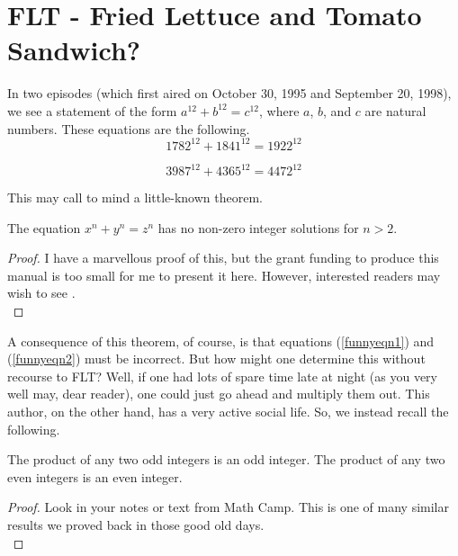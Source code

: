 \chapter{FLT - Fried Lettuce and Tomato Sandwich?}

In two episodes (which first aired on October 30, 1995
and September 20, 1998), we see a statement of the form 
$a^{12}+b^{12}=c^{12}$, where $a$, $b$, and $c$ are natural numbers.
These equations are the following.
\begin{equation}
1782^{12}+1841^{12}=1922^{12}\label{funnyeqn1}
\end{equation}

\begin{equation}
3987^{12}+4365^{12}=4472^{12}\label{funnyeqn2}
\end{equation}

This may call to mind a little-known theorem.

\begin{thm}\label{flt}
The equation $x^n+y^n=z^n$ has no non-zero integer solutions for $n>2$.
\end{thm}

\begin{proof}
I have a marvellous proof of this, but the grant funding to produce this
manual is too small for me to present it here. However, interested 
readers may wish to see \cite{AW1995}.\\
\end{proof}

A consequence of this theorem, of course, is that equations (\ref{funnyeqn1})
and (\ref{funnyeqn2}) must be incorrect. But how might one determine
this without recourse to FLT? Well, if one had lots of spare time late
at night (as you very well may, dear reader), one could just go ahead and
multiply them out. This author, on the other hand, has a very active
social life. So, we instead recall the following.

\begin{lem}\label{integerproducts}
The product of any two odd integers is an odd integer. The product of any 
two even integers is an even integer.
\end{lem}

\begin{proof}
Look in your notes or text from Math Camp. This is one of many similar
results we proved back in those good old days.\\
\end{proof}

